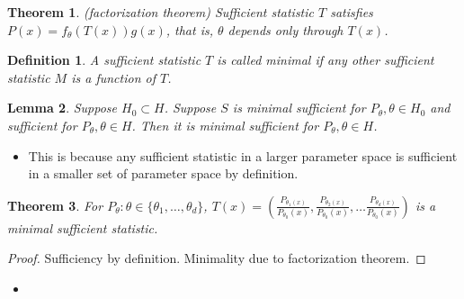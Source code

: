 \documentclass[11pt,reqno]{amsart}
\newtheorem{theorem}{Theorem}
\newtheorem{lemma}[theorem]{Lemma}
\newtheorem{definition}{Definition}
\theoremstyle{remark}
\begin{document}
\begin{theorem}(factorization theorem)
Sufficient statistic $T$ satisfies $P(x)=f_\theta(T(x))g(x)$, that is, $\theta$ depends only through $T(x)$.
\end{theorem}
\begin{definition}
A sufficient statistic $T$ is called minimal if any other sufficient statistic $M$ is a function of $T$.
\end{definition}
\begin{lemma}
Suppose $H_0\subset H$. Suppose $S$ is minimal sufficient for $P_\theta,\theta\in H_0$ and sufficient for $P_\theta,\theta\in H$. Then 
it is minimal sufficient for $P_\theta,\theta\in H$.
\end{lemma} 
\begin{itemize}
\item This is because any sufficient statistic in a larger parameter space is 
sufficient in a smaller set  of parameter space by definition.
\end{itemize}
\begin{theorem}
For $P_\theta:\theta\in\{\theta_1,\dots,\theta_d\}$, $T(x)=(\frac{P_{\theta_1(x)}}{P_{\theta_0}(x)}, 
\frac{P_{\theta_2(x)}}{P_{\theta_0}(x)},\dots \frac{P_{\theta_d(x)}}{P_{\theta_0}(x)})$ is a minimal sufficient statistic.
\end{theorem}
\begin{proof}
Sufficiency by definition. Minimality due to factorization theorem.
\end{proof}
\begin{itemize}
\item 
\end{itemize}
\end{document}
